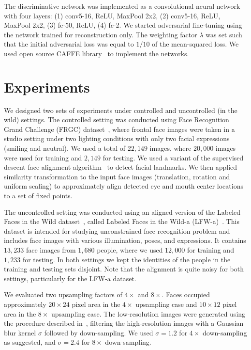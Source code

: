 \documentclass[runningheads]{llncs}
\begin{document}
The discriminative network was implemented as a convolutional neural network with four layers: (1) conv5-16, ReLU, MaxPool 2x2, (2)  conv5-16, ReLU,  MaxPool 2x2, (3) fc-50, ReLU, (4) fc-2. We started adversarial fine-tuning using the network trained for reconstruction only. The weighting factor $\lambda$ was set such that the initial adversarial loss was equal to $1/10$ of the mean-squared loss. We used open source CAFFE library~\cite{jia2014caffe} to implement the networks.









\section{Experiments} \label{sec:Exp}



We designed two sets of experiments under controlled and uncontrolled (in the wild) settings. The controlled setting was conducted using Face Recognition Grand Challenge (FRGC) dataset~\cite{phillips2005overview}, where frontal face images were taken in a studio setting under two lighting conditions with only two facial expressions (smiling and neutral). We used a total of $22,149$ images, where $20,000$ images were used for training and $2,149$ for testing. We used a variant of the supervised descent face alignment algorithm~\cite{xiong2013supervised} to detect facial landmarks. We then applied similarity transformation to the input face images (translation, rotation and uniform scaling) to approximately align detected eye and mouth center locations to a set of fixed points.



The uncontrolled setting was conducted using an aligned version of the Labeled Faces in the Wild dataset~\cite{huang2007labeled}, called Labeled Faces in the Wild-a (LFW-a)~\cite{wolf2011effective}. This dataset is intended for studying unconstrained face recognition problem and includes face images with various illumination, poses, and expressions. It contains $13,233$ face images from $1,680$ people, where we used $12,000$ for training and $1,233$ for testing.
In both settings we kept the identities of the people in the training and testing sets disjoint. Note that the alignment is quite noisy for both settings, particularly for the LFW-a dataset.


We evaluated two upsampling factors of $4\times$ and $8\times$. Faces occupied approximately $20 \times 24$ pixel area in the  $4\times$ upsampling case and $10 \times 12$ pixel area in the $8\times$ upsampling case. The low-resolution images were generated using the procedure described in~\cite{Yang14ECCV}, filtering the high-resolution images with a Gaussian blur kernel $\sigma$ followed by down-sampling. We used $\sigma = 1.2$ for $4\times$ down-sampling as suggested, and $\sigma = 2.4$ for $8\times$ down-sampling.
\end{document}
